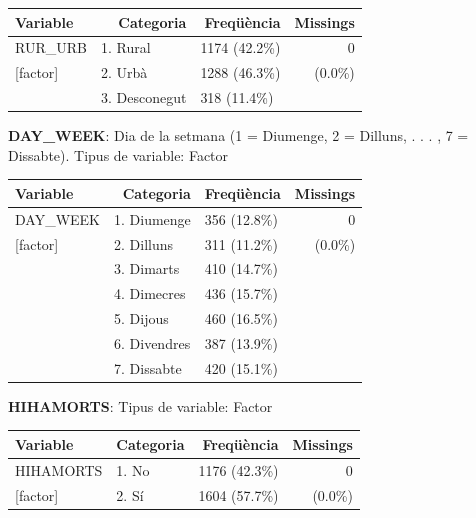 \documentclass[12pt,longbibliography]{article}
\theoremstyle{definition}
\theoremstyle{remark}
\begin{document}
\begin{table}[H]
\centering
\begin{tabular}{lllr}
\hline
Variable     & \multicolumn{1}{r}{Categoria} & \multicolumn{1}{r}{Freqüència} & Missings  \\ \hline
RUR\_URB     & 1. Rural                      & 1174 (42.2\%)                  & 0  \\
{[}factor{]} & 2. Urbà                       & 1288 (46.3\%)                  &      (0.0\%)     \\
             & 3. Desconegut                 & 318 (11.4\%)                   &           \\ \hline
\end{tabular}
\end{table}


\textbf{DAY\_WEEK}: Dia de la setmana (1 = Diumenge, 2 = Dilluns, . . . , 7 = Dissabte). Tipus de variable: Factor



\begin{table}[H]
\centering
\begin{tabular}{llll}
\hline
Variable & \multicolumn{1}{r}{Categoria} & \multicolumn{1}{r}{Freqüència} & \multicolumn{1}{r}{Missings} \\ \hline
DAY\_WEEK    & 1. Diumenge  & 356 (12.8\%) & \multicolumn{1}{r}{0} \\
{[}factor{]} & 2. Dilluns   & 311 (11.2\%) & \multicolumn{1}{r}{(0.0\%)}          \\
             & 3. Dimarts   & 410 (14.7\%) & \multicolumn{1}{r}{}          \\
             & 4. Dimecres  & 436 (15.7\%) &                               \\
             & 5. Dijous    & 460 (16.5\%) &                               \\
             & 6. Divendres & 387 (13.9\%) &                               \\
             & 7. Dissabte  & 420 (15.1\%) &                              \\ \hline
\end{tabular}
\end{table}



\textbf{HIHAMORTS}:  Tipus de variable: Factor


\begin{table}[H]
\centering
\begin{tabular}{llll}
\hline
Variable & \multicolumn{1}{r}{Categoria} & \multicolumn{1}{r}{Freqüència} & \multicolumn{1}{r}{Missings} \\ \hline
HIHAMORTS    & 1. No  & 1176 (42.3\%) & \multicolumn{1}{r}{0} \\
{[}factor{]} & 2. Sí   & 1604 (57.7\%) & \multicolumn{1}{r}{(0.0\%)}          \\\hline
\end{tabular}
\end{table}
\end{document}
